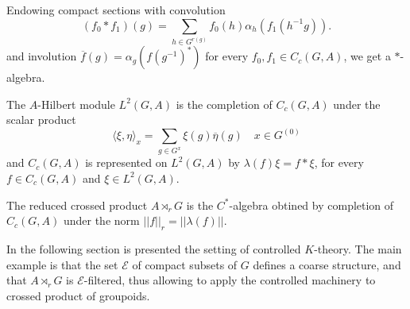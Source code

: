Endowing compact sections with convolution
\[(f_0\ast f_1)(g) = \sum_{h\in G^{r(g)}} f_0(h) \alpha_h(f_1(h^{-1}g)).\]
and involution $\overline f(g)=\alpha_g(f(g^{-1})^*)$ for every $f_0,f_1\in C_c(G,A)$, we get a $*$-algebra. 

The $A$-Hilbert module $L^2(G,A)$ is the completion of $C_c(G,A)$ under the scalar product 
\[\langle \xi ,\eta \rangle_x  = \sum_{g\in G^x} \xi(g)\overline \eta(g) \quad x\in G^{(0)} \]
and $C_c(G,A)$ is represented on $L^2(G,A)$ by $\lambda(f) \xi = f\ast \xi$, for every $ f\in C_c(G,A)$ and $\xi\in L^2(G,A)$.\\

\begin{definition}
The reduced crossed product $A\rtimes_r G$ is the $C^*$-algebra obtined by completion of $C_c(G,A)$ under the norm $||f||_r=||\lambda(f)||$.
\end{definition}

In the following section is presented the setting of controlled $K$-theory. The main example is that the set $\mathcal E$ of compact subsets of $G$ defines a coarse structure, and that $A\rtimes_r G$ is $\mathcal E$-filtered, thus allowing to apply the controlled machinery to crossed product of groupoids. 




